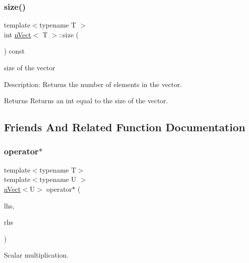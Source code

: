 \subsubsection{\texorpdfstring{size()}{size()}}
{\footnotesize\ttfamily template$<$typename T $>$ \\
int \hyperlink{classnVect}{n\+Vect}$<$ T $>$\+::size (\begin{DoxyParamCaption}{ }\end{DoxyParamCaption}) const}



size of the vector 

Description\+: Returns the number of elements in the vector. \begin{DoxyReturn}{Returns}
Returns an int equal to the size of the vector. 
\end{DoxyReturn}


\subsection{Friends And Related Function Documentation}
\mbox{\label{classnVect_a64c439aa3f26ec0fea5c63a6e52a1be2}} 
\subsubsection{\texorpdfstring{operator$\ast$}{operator*}\hspace{0.1cm}{\footnotesize\ttfamily [1/2]}}
{\footnotesize\ttfamily template$<$typename T$>$ \\
template$<$typename U $>$ \\
\hyperlink{classnVect}{n\+Vect}$<$U$>$ operator$\ast$ (\begin{DoxyParamCaption}\item[{const \hyperlink{classnVect}{n\+Vect}$<$ U $>$ \&}]{lhs,  }\item[{const U \&}]{rhs }\end{DoxyParamCaption})\hspace{0.3cm}{\ttfamily [friend]}}



Scalar multiplication. 

